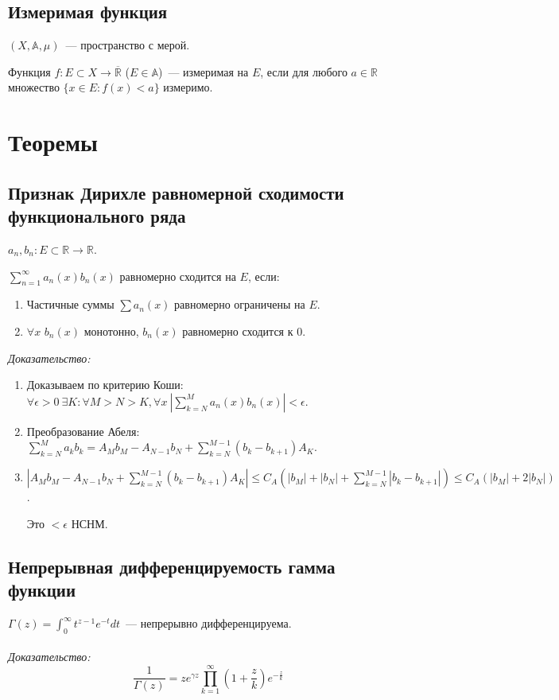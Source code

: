 \documentclass[paper=a4, fontsize=11pt]{article}
\begin{document}
\subsection{Измеримая функция}
$(X,\mathds{A},\mu)$~--- пространство с мерой.

Функция $f: E \subset X \rightarrow \overline{\mathds{R}}$ ($E \in \mathds{A}$)~--- измеримая на $E$, если для любого $a \in \mathds{R}$
множество $\{x \in E: f(x) < a\}$ измеримо.

\section{Теоремы}
\subsection{Признак Дирихле равномерной сходимости функционального ряда}
$a_n, b_n: E \subset \mathds{R} \rightarrow \mathds{R}$.

$\sum_{n=1}^{\infty}a_n(x)b_n(x)$ равномерно сходится на $E$, если:
\begin{enumerate}
    \item Частичные суммы $\sum a_n(x)$ равномерно ограничены на $E$.
    \item $\forall x$ $b_n(x)$ монотонно, $b_n(x)$ равномерно сходится к $0$.
\end{enumerate}

\emph{Доказательство:}
\begin{enumerate}
    \item Доказываем по критерию Коши:
    $\forall \epsilon > 0\ \exists K: \forall M>N>K,\forall x\ |\sum_{k=N}^M a_n(x)b_n(x)| < \epsilon$.
    \item Преобразование Абеля: $\sum_{k=N}^M a_k b_k = A_M b_M - A_{N-1}b_N + \sum_{k=N}^{M-1} (b_k-b_{k+1}) A_K$.
    \item $|A_M b_M - A_{N-1}b_N + \sum_{k=N}^{M-1} (b_k-b_{k+1}) A_K| \leq C_A(|b_M| + |b_N| + \sum_{k=N}^{M-1}|b_k-b_{k+1}|)
    \leq C_A(|b_M| + 2|b_N|)$.

    Это $< \epsilon$ НСНМ.
\end{enumerate}

\subsection{Непрерывная дифференцируемость гамма функции}
$\Gamma(z) = \int_0^{\infty}t^{z-1}e^{-t}dt$~--- непрерывно дифференцируема.
\\\\
\emph{Доказательство:}
$$\frac{1}{\Gamma(z)} = z e^{\gamma z} \prod_{k=1}^{\infty}(1 + \frac{z}{k}) e^{-\frac{z}{k}}$$
\end{document}
